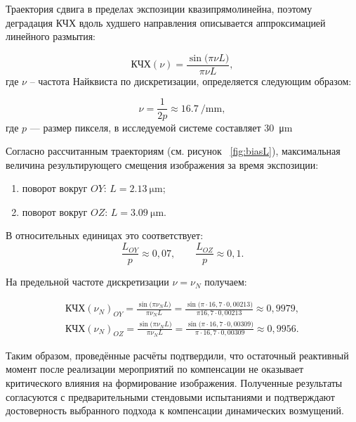  Траектория сдвига в пределах экспозиции квазипрямолинейна, поэтому деградация КЧХ вдоль худшего направления описывается аппроксимацией линейного размытия:
 
 \begin{equation}
 	\label{eq:MTF_aprox}
 	\text{КЧХ}(\nu) = \frac{\sin\!\bigl(\pi \nu L\bigr)}{\pi \nu L},
 \end{equation}
 где \(\nu\) -- частота Найквиста по дискретизации, определяется следующим образом:
 
 \begin{equation}
 	\label{eq:nykvist}
 	\nu = \frac{1}{2p} \approx \SI{16.7}{\per\milli\meter},
 \end{equation}
 где \(p\) --- размер пикселя, в исследуемой системе составляет \SI{30}{\micro\meter}
 
 Согласно рассчитанным траекториям (см. рисунок ~\ref{fig:biasL}), максимальная величина результирующего смещения изображения за время экспозиции:
\begin{samepage}
 \begin{enumerate}
	\item поворот вокруг $OY$: $L= \SI{2,13}{\micro\meter}$;
	\item поворот вокруг $OZ$: $L= \SI{3,09}{\micro\meter}$.
\end{enumerate}
\end{samepage}

 
 В относительных единицах это соответствует:
 \begin{equation}
 	\frac{L_{OY}}{p} \approx 0,07, \quad \quad \frac{L_{OZ}}{p} \approx 0,1.
 \end{equation}
 
 На предельной частоте дискретизации $\nu = \nu_N$ получаем:
 
 \begin{equation}
 	\begin{split}
 		\label{eq:MTF_result}
 		\text{КЧХ}(\nu_N)_{OY}=\frac{\sin\!\bigl(\pi \nu_N L\bigr)}{\pi \nu_N L} =  \frac{\sin\!\bigl(\pi \cdot 16,7 \cdot 0,00213 \bigr)}{\pi 16,7 \cdot 0,00213} \approx  0,9979,\\
 		\text{КЧХ}(\nu_N)_{OZ}=\frac{\sin\!\bigl(\pi \nu_N L\bigr)}{\pi \nu_N L} =  \frac{\sin\!\bigl(\pi \cdot 16,7 \cdot 0,00309 \bigr)}{\pi \cdot 16,7 \cdot 0,00309} \approx 0,9956.
 	\end{split}
 \end{equation}
 
Таким образом, проведённые расчёты подтвердили, что остаточный реактивный момент после реализации мероприятий по компенсации не оказывает критического влияния на формирование изображения. Полученные результаты согласуются с предварительными стендовыми испытаниями и подтверждают достоверность выбранного подхода к компенсации динамических возмущений.
 
